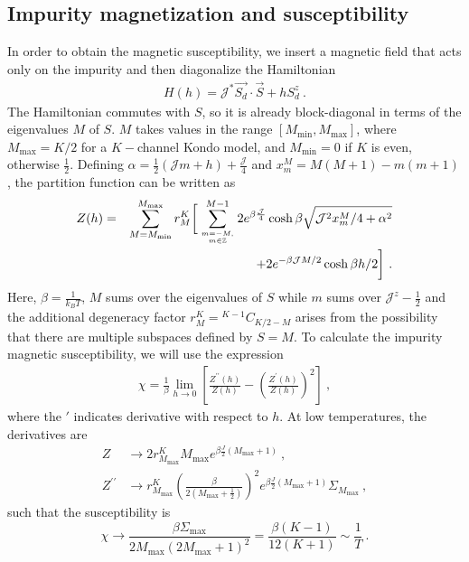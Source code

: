 \documentclass[reprint,prb,superscriptaddress]{revtex4-2}
\begin{document}
\subsection{Impurity magnetization and susceptibility}
\label{sec:imp_suscept}
In order to obtain the magnetic susceptibility, we insert a magnetic field that acts only on the impurity and then diagonalize the Hamiltonian
\begin{align}
	\label{star graph_field_hamiltonian}
	H(h) = {\mathcal{J}^*} \vec{S_d}\cdot\vec{S} + h S_d^z~.
\end{align}
The Hamiltonian commutes with \(S\), so it is already block-diagonal in terms of the eigenvalues \(M\) of \(S\). \(M\) takes values in the range \(\left[M_\text{min}, M_\text{max}\right]\), where \(M_\text{max} = K/2\) for a \(K-\)channel Kondo model, and \(M_\text{min} = 0\)  if \(K\) is even, otherwise \(\frac{1}{2}\). Defining \(\alpha = \frac{1}{2}\left({\mathcal{J}}m + h\right) + \frac{{\mathcal{J}}}{4}\) and \(x^M_m = M(M+1) - m(m+1)\), the partition function can be written as
\begin{eqnarray}
Z(h) &=&\sum_{M=M_\text{min}}^{M_\text{max}}r^K_M\bigg[\sum_{m=-M, \atop{m\in \mathbb{Z}}}^{M-1}2e^{\beta \frac{{\mathcal{J}}}{4}}\cosh \beta\sqrt{{\mathcal{J}}^2x^M_m/4 + \alpha^2} \nonumber\\
&&\hspace{2cm}+ 2e^{-\beta {\mathcal{J}}M/2}\cosh \beta h/2\bigg]~.
\end{eqnarray}
Here, \(\beta = \frac{1}{k_B T}\), \(M\) sums over the eigenvalues of \(S\) while \(m\) sums over \({\mathcal{J}}^z - \frac{1}{2}\) and the additional degeneracy factor \(r^K_M= {}^{K-1}C_{K/2 - M}\) arises from the possibility that there are multiple subspaces defined by \(S=M\). 
To calculate the impurity magnetic susceptibility, we will use the expression
\begin{align}
	\chi = \frac{1}{\beta}\lim_{h \to 0}\left[\frac{Z^{\prime\prime}(h)}{Z(h)} - \left(\frac{Z^{\prime}(h)}{Z(h)}\right)^2 \right] ~,
\end{align}
where the \(\prime\) indicates derivative with respect to \(h\). At low temperatures, the derivatives are 
\begin{align}
	Z &\to 2 r^K_{M_\text{max}} M_\text{max} e^{\beta \frac{J}{2}(M_\text{max} + 1)}~,\\
	Z^{\prime \prime} &\to r^K_{M_\text{max}}\left(\frac{\beta }{2(M_\text{max} + \frac{1}{2})}\right)^2 e^{\beta \frac{J}{2}(M_\text{max} + 1)}\Sigma_{M_\text{max}}~,
\end{align}
such that the susceptibility is
\begin{equation}
	\chi \to \frac{\beta\Sigma_\text{max}}{2M_\text{max}\left(2M_\text{max}+1\right)^2} = \frac{\beta(K-1)}{12(K+1)} \sim \frac{1}{T}~.
\end{equation}
\end{document}
